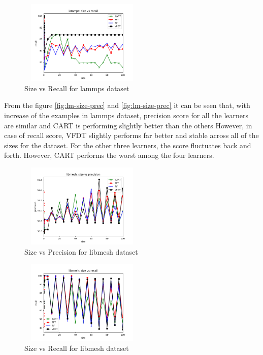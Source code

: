 \documentclass[sigplan]{acmart}\settopmatter{printfolios=true,printccs=false,printacmref=false}
\begin{document}
\begin{figure}[h]
	\includegraphics[width=6cm,height=4cm,keepaspectratio]{fig/lammps-size-recall.png}
	\caption{Size vs Recall for lammps dataset}
	\label{fig:lm-size-rec}
\end{figure}

From the figure \ref{fig:lm-size-prec} and \ref{fig:lm-size-prec} it can be seen that, with increase of the examples in lammps dataset, precision score for all the learners are similar and CART is performing slightly better than the others However, in case of recall score, VFDT slightly performs far better and stable across all of the sizes for the dataset. For the other three learners, the score fluctuates back and forth. However, CART performs the worst among the four learners. 

\begin{figure}[h]
	\includegraphics[width=6cm,height=4cm,keepaspectratio]{fig/libmesh-size-precision.png}
	\caption{Size vs Precision for libmesh dataset}
	\label{fig:lb-size-prec}
\end{figure}

\begin{figure}[h]
	\includegraphics[width=6cm,height=4cm,keepaspectratio]{fig/libmesh-size-recall.png}
	\caption{Size vs Recall for libmesh dataset}
	\label{fig:lb-size-rec}
\end{figure}
\end{document}
